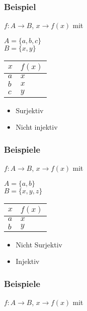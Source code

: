\documentclass[11pt]{article} %
\begin{document}
\subsubsection{Beispiel}


$f: A \rightarrow B$, $x \rightarrow f(x)$ mit

$A= \{a,b,c\}$\\
$B = \{x,y\}$
\begin{table}[h!]
    \begin{tabular}{|l|l|}
        \hline
        $x$ & $f(x)$ \\ \hline
        $a$ & $x$    \\ 
        $b$ & $x$    \\ 
        $c$ & $y$    \\ 
        \hline
    \end{tabular}
\end{table}
\begin{itemize}
\item Surjektiv
\item Nicht injektiv
\end{itemize}

\subsubsection{Beispiele}


$f: A \rightarrow B$, $x \rightarrow f(x)$ mit

$A= \{a,b\}$\\
$B = \{x,y,z\}$
\begin{table}[h!]
    \begin{tabular}{|l|l|}
        \hline
        $x$ & $f(x)$ \\ \hline
        $a$ & $x$    \\ 
        $b$ & $y$    \\  
        \hline
    \end{tabular}
\end{table}
\begin{itemize}
\item Nicht Surjektiv
\item Injektiv
\end{itemize}

\subsubsection{Beispiele}

$f: A \rightarrow B$, $x \rightarrow f(x)$ mit
\end{document}
